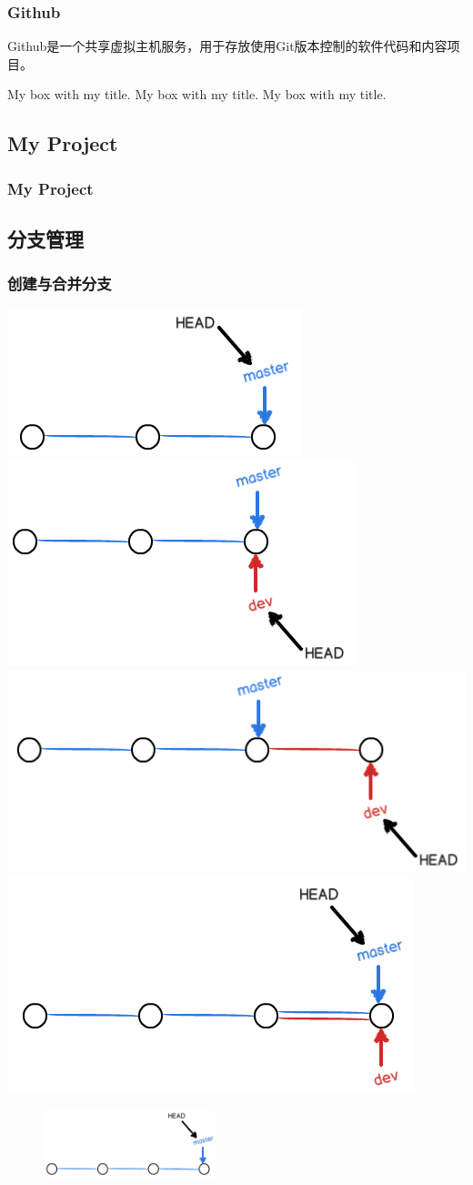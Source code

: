 \documentclass[notheorems,mathserif,table,compress]{beamer}  %
\newcommand\zhushadow[2][purple]{\hskip5pt\shadowbox{\color{#1}\small\kai #2\vspace{3mm}}}
\begin{document}
\begin{frame}
  \frametitle{Github}
  \zhushadow{Github} Github是一个共享虚拟主机服务，用于存放使用Git版本控制的软件代码和内容项目。
\end{frame}


\begin{frame}
  \begin{tcolorbox}[colback=blue!15,colframe=blue!75!black]  
  My box with my title.    My box with my title.    My box with my title.  
  \end{tcolorbox}
\end{frame}

\subsection{My Project}

\begin{frame}
  \frametitle{My Project}
  
\end{frame}

\subsection{分支管理}

\begin{frame}
  \frametitle{创建与合并分支}
  \begin{center}
  \includegraphics[width=0.2\linewidth]{1.png}
  \hspace{0.5em}
  \includegraphics[width=0.2\linewidth]{2.png}
  \hspace{0.5em}
  \includegraphics[width=0.2\linewidth]{3.png}
  \hspace{0.5em}
  \includegraphics[width=0.2\linewidth]{4.png}
  \end{center}
  \begin{figure}[h]
  \centering
  \centerline{\includegraphics[width=5cm]{5.png}}
  \end{figure}
\end{frame}
\end{document}
